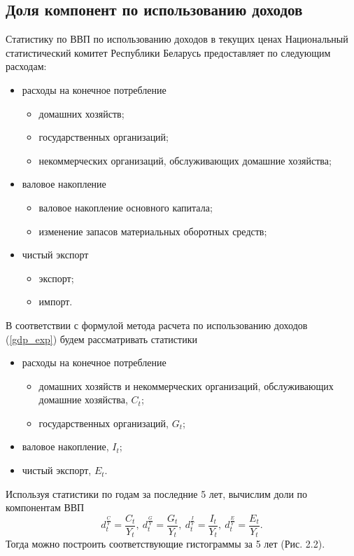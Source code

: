 \documentclass[a4paper, 14pt]{extreport}
\numberwithin{equation}{section}
\numberwithin{equation}{section}
\begin{document}
	\subsection{Доля компонент по использованию доходов} 
	
	Статистику по ВВП по использованию доходов в текущих ценах Национальный статистический комитет Республики Беларусь предоставляет по следующим расходам:
	\begin{itemize}
		\item расходы на конечное потребление
		\begin{itemize}
			\item домашних хозяйств;
			\item государственных организаций;
			\item некоммерческих организаций, обслуживающих домашние хозяйства;
		\end{itemize}
		\item валовое накопление
		\begin{itemize}
			\item валовое накопление основного капитала;
			\item изменение запасов материальных оборотных средств;
		\end{itemize}
		\item чистый экспорт
		\begin{itemize}
			\item экспорт;
			\item импорт.
		\end{itemize}
	\end{itemize}
	В соответствии с формулой метода расчета по использованию доходов (\ref{gdp_exp}) будем рассматривать статистики
	\begin{itemize}
		\item расходы на конечное потребление
		\begin{itemize}
			\item домашних хозяйств и некоммерческих организаций, обслуживающих домашние хозяйства, $C_t$;
			\item государственных организаций, $G_t$;
		\end{itemize}
		\item валовое накопление, $I_t$;
		\item чистый экспорт, $E_t$.
	\end{itemize}
	Используя статистики по годам за последние 5 лет, вычислим доли по компонентам ВВП
	\begin{equation}
		d_t^{\frac CY} = \dfrac{C_t}{Y_t},\ d_t^{\frac GY} = \dfrac{G_t}{Y_t},\ d_t^{\frac IY} = \dfrac{I_t}{Y_t},\ d_t^{\frac EY} = \dfrac{E_t}{Y_t}.
	\end{equation}
	Тогда можно построить соответствующие гистограммы за 5 лет (Рис. 2.2).
	
\end{document}
